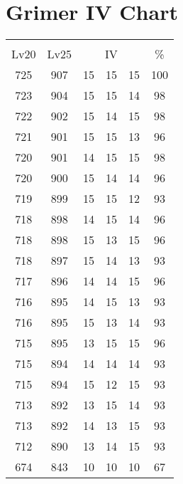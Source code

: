 \documentclass{article}%
\begin{document}
%
\normalsize%
\section{Grimer IV Chart}%
\label{sec:Grimer IV Chart}%
\renewcommand{\arraystretch}{1.5}%
\begin{tabular}{|c|c|c|c|c|c|}%
\hline%
\multicolumn{6}{|c|}{\textcolor{white}{ 
\linebreak{Grimer}
}%
\cellcolor{black}}\\%
\multicolumn{1}{|c}{Lv20}&\multicolumn{1}{c|}{Lv25}&\multicolumn{3}{c|}{IV}&\multicolumn{1}{|c|}{\%}\\%
\hline%
\rowcolor{color100}%
725&907&15&15&15&100\\%
\hline%
\rowcolor{color98}%
723&904&15&15&14&98\\%
\hline%
\rowcolor{color98}%
722&902&15&14&15&98\\%
\hline%
\rowcolor{color96}%
721&901&15&15&13&96\\%
\hline%
\rowcolor{color98}%
720&901&14&15&15&98\\%
\hline%
\rowcolor{color96}%
720&900&15&14&14&96\\%
\hline%
\rowcolor{color93}%
719&899&15&15&12&93\\%
\hline%
\rowcolor{color96}%
718&898&14&15&14&96\\%
\hline%
\rowcolor{color96}%
718&898&15&13&15&96\\%
\hline%
\rowcolor{color93}%
718&897&15&14&13&93\\%
\hline%
\rowcolor{color96}%
717&896&14&14&15&96\\%
\hline%
\rowcolor{color93}%
716&895&14&15&13&93\\%
\hline%
\rowcolor{color93}%
716&895&15&13&14&93\\%
\hline%
\rowcolor{color96}%
715&895&13&15&15&96\\%
\hline%
\rowcolor{color93}%
715&894&14&14&14&93\\%
\hline%
\rowcolor{color93}%
715&894&15&12&15&93\\%
\hline%
\rowcolor{color93}%
713&892&13&15&14&93\\%
\hline%
\rowcolor{color93}%
713&892&14&13&15&93\\%
\hline%
\rowcolor{color93}%
712&890&13&14&15&93\\%
\hline%
\rowcolor{color91}%
674&843&10&10&10&67\\%
\end{tabular}

%
\end{document}
